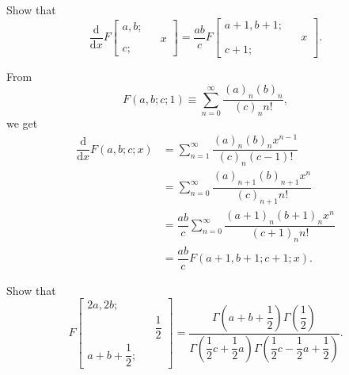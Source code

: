 \begin{problem}\label{problem1chapter4}
Show that 
$$\dfrac{\mathrm{d}}{\mathrm{d}x} F \left[ \begin{array}{rlr}
a, b; & & \\
& & x \\
c; & & \end{array} \right] = \dfrac{ab}{c} F \left[ \begin{array}{rlr}
a+1,b+1 ; & & \\
& & x \\
c+1; 
\end{array} \right].$$
\end{problem}
\begin{solution}
From
$$F(a,b;c;1) \equiv \displaystyle\sum_{n=0}^{\infty} \dfrac{(a)_n (b)_n}{(c)_n n!},$$
we get
$$\begin{array}{ll}
\dfrac{\mathrm{d}}{\mathrm{d}x} F(a,b;c;x) &= \displaystyle\sum_{n=1}^{\infty} \dfrac{(a)_n(b)_n x^{n-1}}{{(c)_n(c-1)!}} \\
&= \displaystyle\sum_{n=0}^{\infty} \dfrac{(a)_{n+1} (b)_{n+1} x^n}{(c)_{n+1} n!} \\
&= \dfrac{ab}{c} \displaystyle\sum_{n=0}^{\infty} \dfrac{(a+1)_n (b+1)_n x^n}{(c+1)_n n!} \\
&= \dfrac{ab}{c} F(a+1,b+1; c+1; x).
\end{array}$$
\end{solution}
\begin{problem}\label{problem2chapter4}
Show that
$$F \left[ \begin{array}{rlr} 
2a, 2b; & & \\
& & \dfrac{1}{2} \\
a + b + \dfrac{1}{2};
\end{array} \right] = \dfrac{\Gamma \left( a + b + \dfrac{1}{2} \right) \Gamma \left( \dfrac{1}{2} \right)}{\Gamma \left( \dfrac{1}{2}c + \dfrac{1}{2}a \right) \Gamma \left( \dfrac{1}{2} c - \dfrac{1}{2} a + \dfrac{1}{2} \right) }.$$
\end{problem}
